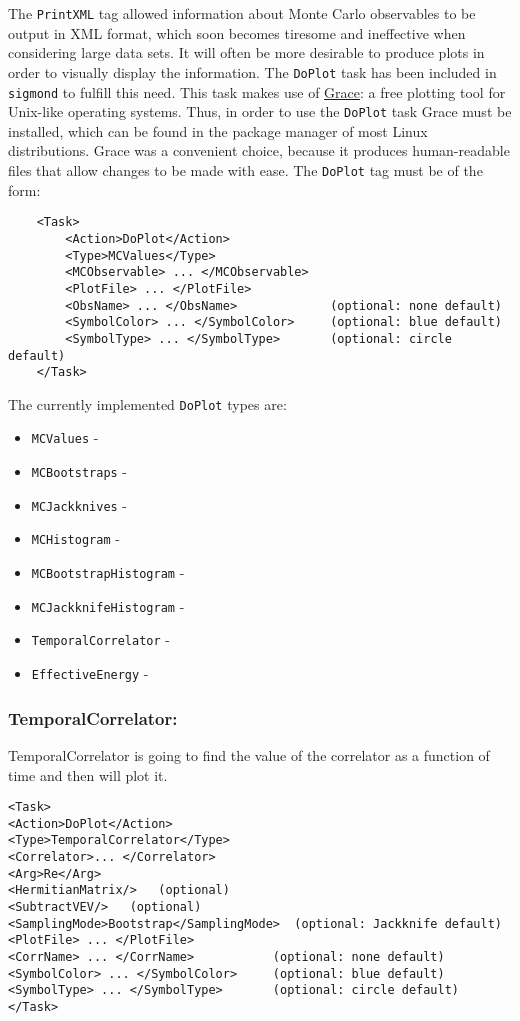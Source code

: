 \documentclass[12pt]{article}
\newcommand{\vb}{\texttt}
\begin{document}
The \vb{PrintXML} tag allowed information about Monte Carlo observables to be output
in XML format, which soon becomes tiresome and ineffective when considering large data sets.
It will often be more desirable to produce plots in order to visually display the information.
The \vb{DoPlot} task has been included in \vb{sigmond} to fulfill this need. This task makes
use of \href{http://plasma-gate.weizmann.ac.il/Grace/}{Grace}: a free plotting tool
for Unix-like operating systems. Thus, in order to use the \vb{DoPlot} task Grace must
be installed, which can be found in the package manager of most Linux distributions.
Grace was a convenient choice, because it produces human-readable files that allow
changes to be made with ease. The \vb{DoPlot} tag must be of the form:
\begin{verbatim}
    <Task>
        <Action>DoPlot</Action>
        <Type>MCValues</Type>
        <MCObservable> ... </MCObservable>
        <PlotFile> ... </PlotFile>
        <ObsName> ... </ObsName>             (optional: none default)
        <SymbolColor> ... </SymbolColor>     (optional: blue default)
        <SymbolType> ... </SymbolType>       (optional: circle default)
    </Task>
\end{verbatim}
The currently implemented \vb{DoPlot} types are:
\begin{itemize}
\item \vb{MCValues} -
\item \vb{MCBootstraps} -
\item \vb{MCJackknives} -
\item \vb{MCHistogram} -
\item \vb{MCBootstrapHistogram} -
\item \vb{MCJackknifeHistogram} -
\item \vb{TemporalCorrelator} -
\item \vb{EffectiveEnergy} -
\end{itemize}

\subsubsection{TemporalCorrelator:}

TemporalCorrelator is going to find the value of the correlator as a function of time and then will plot it.
\begin{verbatim}
<Task>
<Action>DoPlot</Action>
<Type>TemporalCorrelator</Type>
<Correlator>... </Correlator>
<Arg>Re</Arg>
<HermitianMatrix/>   (optional)
<SubtractVEV/>   (optional)
<SamplingMode>Bootstrap</SamplingMode>  (optional: Jackknife default)
<PlotFile> ... </PlotFile>
<CorrName> ... </CorrName>           (optional: none default)
<SymbolColor> ... </SymbolColor>     (optional: blue default)
<SymbolType> ... </SymbolType>       (optional: circle default)
</Task> 
\end{verbatim}
\end{document}
